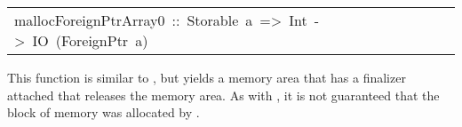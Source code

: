 \begin{haddockdesc}
\item[\begin{tabular}{@{}l}
mallocForeignPtrArray0\ ::\ Storable\ a\ =>\ Int\ ->\ IO\ (ForeignPtr\ a)
\end{tabular}]\haddockbegindoc
This function is similar to ,
 but yields a memory area that has a finalizer attached that releases
 the memory area.  As with , it is not guaranteed that
 the block of memory was allocated by .
\par

\end{haddockdesc}
